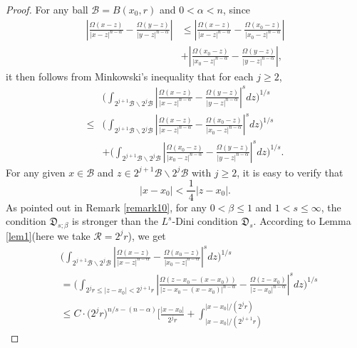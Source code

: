 \documentclass[10pt,a4paper]{amsart}
\begin{document}
\begin{proof}
For any ball $\mathcal{B}=B(x_0,r)$ and $0<\alpha<n$, since
\begin{equation*}
\begin{split}
\left|\frac{\Omega(x-z)}{|x-z|^{n-\alpha}}-\frac{\Omega(y-z)}{|y-z|^{n-\alpha}}\right|
&\leq\left|\frac{\Omega(x-z)}{|x-z|^{n-\alpha}}-\frac{\Omega(x_0-z)}{|x_0-z|^{n-\alpha}}\right|\\
&+\left|\frac{\Omega(x_0-z)}{|x_0-z|^{n-\alpha}}-\frac{\Omega(y-z)}{|y-z|^{n-\alpha}}\right|,
\end{split}
\end{equation*}
it then follows from Minkowski's inequality that for each $j\geq2$,
\begin{equation*}
\begin{split}
&\bigg(\int_{2^{j+1}\mathcal{B}\backslash 2^j\mathcal{B}}
\left|\frac{\Omega(x-z)}{|x-z|^{n-\alpha}}-\frac{\Omega(y-z)}{|y-z|^{n-\alpha}}\right|^sdz\bigg)^{1/s}\\
\leq&
\bigg(\int_{2^{j+1}\mathcal{B}\backslash 2^j\mathcal{B}}\left|\frac{\Omega(x-z)}{|x-z|^{n-\alpha}}-\frac{\Omega(x_0-z)}{|x_0-z|^{n-\alpha}}\right|^sdz\bigg)^{1/s}\\
&+\bigg(\int_{2^{j+1}\mathcal{B}\backslash 2^j\mathcal{B}}
\left|\frac{\Omega(x_0-z)}{|x_0-z|^{n-\alpha}}-\frac{\Omega(y-z)}{|y-z|^{n-\alpha}}\right|^sdz\bigg)^{1/s}.
\end{split}
\end{equation*}
For any given $x\in\mathcal{B}$ and $z\in 2^{j+1}\mathcal{B}\backslash 2^j\mathcal{B}$ with $j\geq2$, it is easy to verify that
\begin{equation*}
|x-x_0|<\frac{\,1\,}{4}|z-x_0|.
\end{equation*}
As pointed out in Remark \ref{remark10}, for any $0<\beta\leq 1$ and $1<s\le\infty$, the condition $\mathfrak{D}_{s;\beta}$ is stronger than the $L^s$-Dini condition $\mathfrak{D}_{s}$. According to Lemma \ref{lem1}(here we take $\mathcal{R}=2^jr$), we get
\begin{equation*}
\begin{split}
&\bigg(\int_{2^{j+1}\mathcal{B}\backslash2^j\mathcal{B}}
\left|\frac{\Omega(x-z)}{|x-z|^{n-\alpha}}-\frac{\Omega(x_0-z)}{|x_0-z|^{n-\alpha}}\right|^sdz\bigg)^{1/s}\\
&=\bigg(\int_{2^jr\leq|z-x_0|<2^{j+1}r}\left|\frac{\Omega(z-x_0-(x-x_0))}{|z-x_0-(x-x_0)|^{n-\alpha}}
-\frac{\Omega(z-x_0)}{|z-x_0|^{n-\alpha}}\right|^sdz\bigg)^{1/s}\\
&\leq C\cdot\big(2^jr\big)^{n/s-(n-\alpha)}\bigg[\frac{|x-x_0|}{2^jr}+\int_{|x-x_0|/{(2^{j+1}r)}}^{|x-x_0|/{(2^jr)}}

\end{split}
\end{equation*}
\end{proof}
\end{document}
